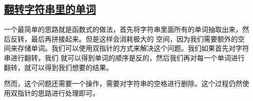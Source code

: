 \documentclass[../../main.tex]{subfiles}
\begin{document}
\subsection{\href{https://leetcode-cn.com/problems/reverse-words-in-a-string/}{翻转字符串里的单词}}

一个最简单的思路就是函数式的做法，首先将字符串里面所有的单词抽取出来，然后反转，最后再拼接起来。但是这样会消耗极大的
空间，因为我们需要额外的空间来存储单词。我们可以使用双指针的方式来解决这个问题。我们如果首先对字符串进行翻转，我们
就可以得到单词的顺序是反的，然后我们再对每一个单词进行翻转，就可以得到我们想要的结果。

然而，这个问题还需要一个操作，需要对字符串的空格进行删除。这个过程仍然使用双指针的思路进行处理即可。


\end{document}
